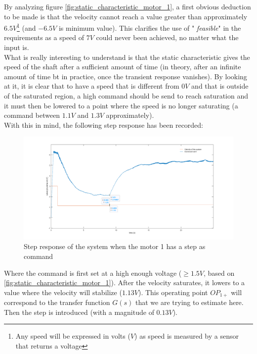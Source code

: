By analyzing figure \ref{fig:static_characteristic_motor_1}, a first obvious deduction to be made is that the velocity
cannot reach a value greater than approximately $6.5 V$\footnote{Any speed will be expressed in volts ($V$) as speed is
measured by a sensor that returns a voltage} (and $-6.5 V$ is minimum value). This clarifies the use of "\textit{
feasible}" in the requirements as a speed of $7 V$ could never been achieved, no matter what the input is.\\

What is really interesting to understand is that the static characteristic gives the speed of the shaft after a
sufficient amount of time (in theory, after an infinite amount of time bt in practice, once the transient response 
vanishes). By looking at it, it is clear that to have a speed that is different from $0 V$ and that is outside of the
saturated region, a high command should be send to reach saturation and it must then be lowered to a point where the
speed is no longer saturating (a command between $1.1 V$ and $1.3 V$ approximately).\\

With this in mind, the following step response has been recorded:

\begin{figure}[H]
    \centering
    \includegraphics[height=\textheight/3]{Pictures/step_response_positive_motor_1.png}
    \caption{Step response of the system when the motor 1 has a step as command}
    \label{fig:step_response_positive_motor_1}
\end{figure}

Where the command is first set at a high enough voltage ($\geq 1.5 V$, based on \ref{fig:static_characteristic_motor_1}). 
After the velocity saturates, it lowers to a value where the velocity will stabilize ($1.13 V$). This operating point 
\textit{$OP_{1+}$} will correspond to the transfer function $G(s)$ that we are trying to estimate here. Then the step is
introduced (with a magnitude of $0.13 V$).

